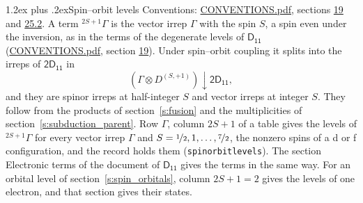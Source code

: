 \documentclass[10pt,a4paper]{article}
\makeatletter
\renewcommand\section{\@startsection{section}{1}{\z@}{-3ex plus -1ex minus -.2ex}%
  {1.2ex plus .2ex}{\normalfont\large\sffamily\bfseries\color{parttitle}}}
\numberwithin{equation}{section}
\newcommand{\grp}[1]{\mathsf{#1}}
\newcommand{\restr}[2]{#1\!\downarrow#2}
\newcommand{\irrJp}[2]{D^{(#1,#2)}}
\newcommand{\irrprod}{\otimes}
\newcommand{\term}[2]{{}^{#1}#2}
\makeatother
\begin{document}
\section{Spin--orbit levels}\label{s:spin_orbit}
Conventions: \href{../../CONVENTIONS.pdf}{CONVENTIONS.pdf}, sections \href{../../../rotation/CONVENTIONS.pdf\#conv.19}{19} and \href{../../CONVENTIONS.pdf\#conv.25.2}{25.2}.
\leavevmode\label{n:local.spin}\label{n:symbol.term}A term $\term{2S+1}{\Gamma}$ is the vector irrep $\Gamma$ with the spin $S$, a spin even under the inversion, as in the terms of the degenerate levels of \href{../../../rotation/data/pdf/D11.pdf}{$\grp{D_{11}}$} (\href{../../CONVENTIONS.pdf}{CONVENTIONS.pdf}, section \href{../../../rotation/CONVENTIONS.pdf\#conv.19}{19}). Under spin--orbit coupling it splits into the irreps of $\grp{2D_{11}}$ in
\begin{equation}\label{e:spinorbit}\restr{(\Gamma \irrprod \irrJp{S}{+1})}{\grp{2D_{11}}},\end{equation}
and they are spinor irreps at half-integer $S$ and vector irreps at integer $S$. They follow from the products of section~\ref{s:fusion} and the multiplicities of section~\ref{s:subduction_parent}. Row $\Gamma$, column $2S + 1$ of a table gives the levels of $\term{2S+1}{\Gamma}$ for every vector irrep $\Gamma$ and $S = \nicefrac{1}{2}, 1, \dots, \nicefrac{7}{2}$, the nonzero spins of a d or f configuration, and the record holds them (\texttt{spinorbitlevels}). The section Electronic terms of the document of \href{../../../rotation/data/pdf/D11.pdf}{$\grp{D_{11}}$} gives the terms in the same way. For an orbital level of section~\ref{s:spin_orbitals}, column $2S + 1 = 2$ gives the levels of one electron, and that section gives their states.
\end{document}
